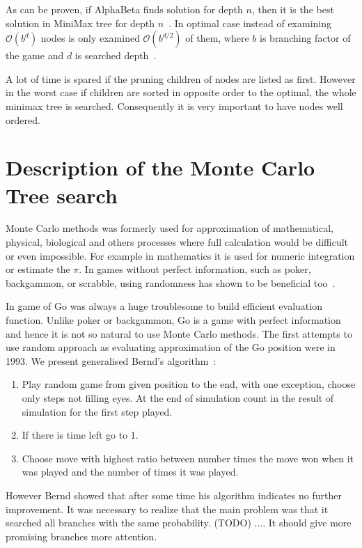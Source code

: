 As can be proven, if AlphaBeta finds solution for depth $n$, then it is the best
solution in MiniMax tree for depth $n$~\cite{knuth:alphabeta}. In optimal case
instead of examining $\mathcal O(b^d)$ nodes is only examined $\mathcal
O(b^{d/2})$ of them, where $b$ is branching factor of the game and $d$ is
searched depth~\cite{ZHONG}.

A lot of time is spared if the pruning children of nodes are listed as first.
However in the worst case if children are sorted in opposite order to the
optimal, the whole minimax tree is searched. Consequently it is very important
to have nodes well ordered.


\section{Description of the Monte Carlo Tree search}
Monte Carlo methods was formerly used for approximation of mathematical,
physical, biological and others processes where full calculation would be
difficult or even impossible. For example in mathematics it is used for numeric
integration or estimate the $\pi$. In games without perfect information, such
as poker, backgammon, or scrabble, using randomness has shown to be beneficial
too~\cite{MonteCarloMethod, MonteCarloGo}.

In game of Go was always a huge troublesome to build efficient evaluation
function. Unlike poker or backgammon, Go is a game with perfect information and
hence it is not so natural to use Monte Carlo methods. The first attempts to
use random approach as evaluating approximation of the Go position were in
1993. We present generalised Bernd's algorithm~\cite{BERND,KOZELEK}:

\begin{enumerate}
\item Play random game from given position to the end, with one exception,
	choose only steps not filling eyes. At the end of simulation count in the
	result of simulation for the first step played.
\item If there is time left go to 1.
\item Choose move with highest ratio between number times the move won when it
	  was played and the number of times it was played.
\end{enumerate}

However Bernd showed that after some time his algorithm indicates no further
improvement. It was necessary to realize that the main problem was that it
searched all branches with the same probability. (TODO) .... It should give more
promising branches more attention.


